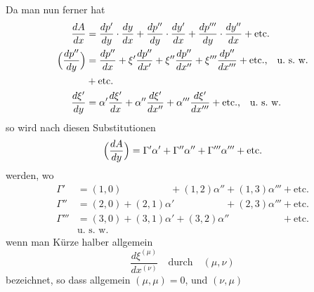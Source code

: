 \documentclass[12pt,a4paper]{article}
\begin{document}
\smallskip\noindent
Da man nun ferner hat
\begin{align*}
\frac{dA}{dx} &= \frac{dp'}{dy}\cdot\frac{dy}{dx} + \frac{dp''}{dy}\cdot\frac{dy'}{dx} + \frac{dp'''}{dy}\cdot\frac{dy''}{dx} + \text{etc.}\\
\Bigl(\frac{dp''}{dy}\Bigr) &= \frac{dp''}{dx} + \xi'\frac{dp''}{dx'} + \xi''\frac{dp''}{dx''} + \xi'''\frac{dp''}{dx'''} + \text{etc.,\quad u.~s.~w.}\\
&+ \text{etc.}\\
\frac{d\xi'}{dy} &= \alpha'\frac{d\xi'}{dx} + \alpha''\frac{d\xi'}{dx''} + \alpha'''\frac{d\xi'}{dx'''} + \text{etc.,\quad u.~s.~w.}
\end{align*}
so wird nach diesen Substitutionen
\begin{equation*}
\Bigl(\frac{dA}{dy}\Bigr) = \Gamma'\alpha' + \Gamma''\alpha'' + \Gamma'''\alpha''' + \text{etc.}
\end{equation*}
werden, wo
\begin{align*}
\Gamma' &= (1,0)\phantom{+(1,1)\alpha'}+(1,2)\alpha''+(1,3)\alpha'''+\text{etc.}\\
\Gamma'' &= (2,0)+(2,1)\alpha'\phantom{+(2,2)\alpha''}+(2,3)\alpha'''+\text{etc.}\\
\Gamma'''&= (3,0)+(3,1)\alpha'+(3,2)\alpha''\phantom{+(3,3)\alpha'''}+\text{etc.}\\
&\text{u.~s.~w.}
\end{align*}
wenn man Kürze halber allgemein
\begin{equation*}
\frac{d\xi^{(\mu)}}{dx^{(\nu)}} \quad \text{durch} \quad (\mu,\nu)
\end{equation*}
bezeichnet, so dass allgemein $(\mu,\mu)=0$, und $(\nu,\mu)$
\end{document}
